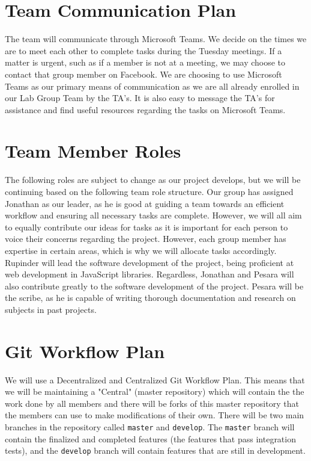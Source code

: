 \documentclass{article}
\begin{document}
\section{Team Communication Plan}
The team will communicate through Microsoft Teams. We decide on the times we are to meet each other to complete tasks during the Tuesday meetings. If a matter is urgent, such as if a member is not at a meeting, we may choose to contact that group member on Facebook. We are choosing to use Microsoft Teams as our primary means of communication as we are all already enrolled in our Lab Group Team by the TA's. It is also easy to message the TA's for assistance and find useful resources regarding the tasks on Microsoft Teams.

\section{Team Member Roles}
The following roles are subject to change as our project develops, but we will be continuing based on the following team role structure. Our group has assigned Jonathan as our leader, as he is good at guiding a team towards an efficient workflow and ensuring all necessary tasks are complete. However, we will all aim to equally contribute our ideas for tasks as it is important for each person to voice their concerns regarding the project. However, each group member has expertise in certain areas, which is why we will allocate tasks accordingly. Rupinder will lead the software development of the project, being proficient at web development in JavaScript libraries. Regardless, Jonathan and Pesara will also contribute greatly to the software development of the project. Pesara will be the scribe, as he is capable of writing thorough documentation and research on subjects in past projects. 

\section{Git Workflow Plan}
We will use a Decentralized and Centralized Git Workflow Plan. This means that we will be maintaining a "Central" (master repository) which will contain the the work done by all members and there will be forks of this master repository that the members can use to make modifications of their own. There will be two main branches in the repository called \texttt{master} and \texttt{develop}. The \texttt{master} branch will contain the finalized and completed features (the features that pass integration tests), and the \texttt{develop} branch will contain features that are still in development.
\end{document}
